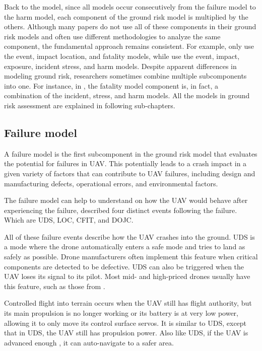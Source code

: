 \documentclass[12pt]{report}
\begin{document}
        Back to the model, since all models occur consecutively from the failure model to the harm model, each component
        of the ground risk model is multiplied by the others. Although many papers do not use all of these components in
        their ground risk models and often use different methodologies to analyze the same component, the fundamental
        approach remains consistent. For example, \cite{primatesta_ground_2020} only use the event, impact location, and
        fatality models, while \cite{kim_risk-based_2022} use the event, impact, exposure, incident stress, and harm
        models. Despite apparent differences in modeling ground risk, researchers sometimes combine multiple
        subcomponents into one. For instance, in \cite{primatesta_ground_2020}, the fatality model component is, in
        fact, a combination of the incident, stress, and harm models. All the models in ground risk assessment are
        explained in following sub-chapters.

        \subsection{Failure model}
            A failure model is the first subcomponent in the ground risk model that evaluates the potential for failures
            in UAV. This potentially leads to a crash impact in a given variety of factors that can contribute to UAV
            failures, including design and manufacturing defects, operational errors, and environmental factors.

                The failure model can help to understand on how the UAV would behave after experiencing the failure,
            \cite{washington_review_2017} described four distinct events following the failure. Which are \ac{UDS}, 
            \ac{LOC}, \ac{CFIT}, and \ac{DOJC}.

            All of these failure events describe how the UAV crashes into the ground. UDS is a mode where the drone
            automatically enters a safe mode and tries to land as safely as possible. Drone manufacturers often
            implement this feature when critical components are detected to be defective. UDS can also be triggered when
            the UAV loses its signal to its pilot. Most mid- and high-priced drones usually have this feature, such as
            those from \cite{dji_consumer_2024}.
                
            Controlled flight into terrain occurs when the UAV still has flight authority, but its main propulsion is no
            longer working or its battery is at very low power, allowing it to only move its control surface servos. It
            is similar to UDS, except that in UDS, the UAV still has propulsion power. Also like UDS, if the UAV is
            advanced enough \cite{nemire_dji_2015}, it can auto-navigate to a safer area.
                
\end{document}
